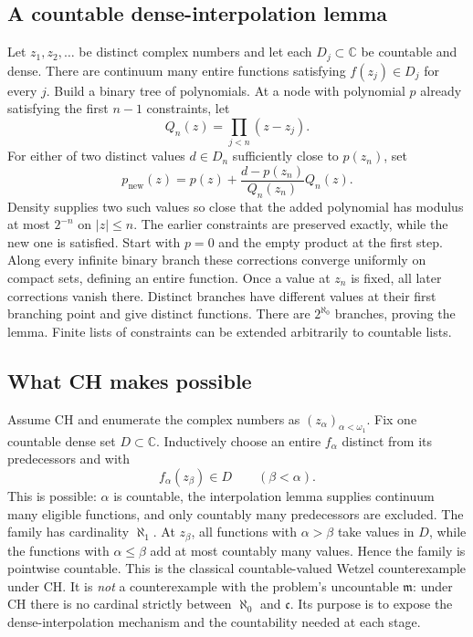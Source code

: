 \subsection*{A countable dense-interpolation lemma}
Let $z_1,z_2,\ldots$ be distinct complex numbers and let each $D_j\subset\mathbb C$ be countable and dense. There are continuum many entire functions satisfying $f(z_j)\in D_j$ for every $j$.
Build a binary tree of polynomials. At a node with polynomial $p$ already satisfying the first $n-1$ constraints, let
\[
 Q_n(z)=\prod_{j<n}(z-z_j).
\]
For either of two distinct values $d\in D_n$ sufficiently close to $p(z_n)$, set
\[
 p_{\mathrm{new}}(z)=p(z)+\frac{d-p(z_n)}{Q_n(z_n)}Q_n(z).
\]
Density supplies two such values so close that the added polynomial has modulus at most $2^{-n}$ on $|z|\le n$. The earlier constraints are preserved exactly, while the new one is satisfied. Start with $p=0$ and the empty product at the first step.
Along every infinite binary branch these corrections converge uniformly on compact sets, defining an entire function. Once a value at $z_n$ is fixed, all later corrections vanish there. Distinct branches have different values at their first branching point and give distinct functions. There are $2^{\aleph_0}$ branches, proving the lemma. Finite lists of constraints can be extended arbitrarily to countable lists.

\subsection*{What CH makes possible}
Assume CH and enumerate the complex numbers as $(z_\alpha)_{\alpha<\omega_1}$. Fix one countable dense set $D\subset\mathbb C$. Inductively choose an entire $f_\alpha$ distinct from its predecessors and with
\[
 f_\alpha(z_\beta)\in D\qquad(\beta<\alpha).
\]
This is possible: $\alpha$ is countable, the interpolation lemma supplies continuum many eligible functions, and only countably many predecessors are excluded. The family has cardinality $\aleph_1$. At $z_\beta$, all functions with $\alpha>\beta$ take values in $D$, while the functions with $\alpha\le\beta$ add at most countably many values. Hence the family is pointwise countable.
This is the classical countable-valued Wetzel counterexample under CH. It is \emph{not} a counterexample with the problem's uncountable $\mathfrak m$: under CH there is no cardinal strictly between $\aleph_0$ and $\mathfrak c$. Its purpose is to expose the dense-interpolation mechanism and the countability needed at each stage.


